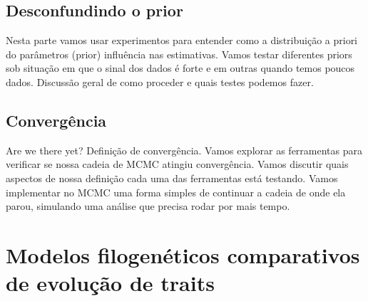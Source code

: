 \documentclass[10pt,a4paper]{article}
\begin{document}
\subsection{Desconfundindo o prior}

Nesta parte vamos usar experimentos para entender como a distribuição a priori do parâmetros (prior) influência nas estimativas. Vamos testar diferentes priors sob situação em que o sinal dos dados é forte e em outras quando temos poucos dados. Discussão geral de como proceder e quais testes podemos fazer.

\subsection{Convergência}

Are we there yet? Definição de convergência. Vamos explorar as ferramentas para verificar se nossa cadeia de MCMC atingiu convergência. Vamos discutir quais aspectos de nossa definição cada uma das ferramentas está testando. Vamos implementar no MCMC uma forma simples de continuar a cadeia de onde ela parou, simulando uma análise que precisa rodar por mais tempo.

\section{Modelos filogenéticos comparativos de evolução de traits}
\end{document}
